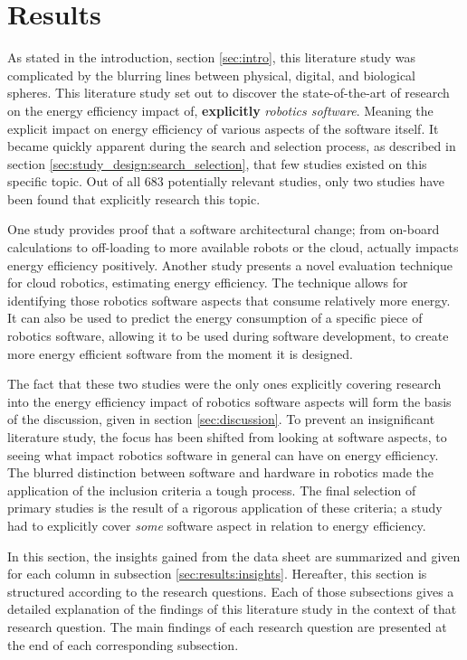 \section{Results}
\label{sec:results}
As stated in the introduction, section \ref{sec:intro}, this literature study was complicated by 
the blurring lines between physical, digital, and biological spheres.
This literature study set out to discover the state-of-the-art of research on the energy efficiency impact of, \textbf{explicitly} \textit{robotics software}.
Meaning the explicit impact on energy efficiency of various aspects of the software itself.
It became quickly apparent during the search and selection process, as described in section \ref{sec:study_design:search_selection}, 
that few studies existed on this specific topic.
Out of all 683 potentially relevant studies, only two studies have been found that explicitly research this topic.

One study \cite{rahman2019cloud_robot_offloading} provides proof that a software architectural change; 
from on-board calculations to off-loading to more available robots or the cloud, actually impacts energy efficiency positively.
Another study \cite{hou2017novel_cloud_evaluation_model} presents a novel evaluation technique for cloud robotics, estimating energy efficiency.
The technique allows for identifying those robotics software aspects that consume relatively more energy. 
It can also be used to predict the energy consumption of a specific piece of robotics software, allowing it to be used during software development, 
to create more energy efficient software from the moment it is designed.

The fact that these two studies were the only ones explicitly covering research into the energy efficiency impact of robotics software aspects will
form the basis of the discussion, given in section \ref{sec:discussion}.
To prevent an insignificant literature study, the focus has been shifted from looking at software aspects, to seeing what impact 
robotics software in general can have on energy efficiency. The blurred distinction between software and hardware in robotics made the 
application of the inclusion criteria a tough process.
The final selection of primary studies is the result of a rigorous application of these criteria; 
a study had to explicitly cover \textit{some} software aspect in relation to energy efficiency.

In this section, the insights gained from the data sheet are summarized and given for each column in subsection \ref{sec:results:insights}.
Hereafter, this section is structured according to the research questions.
Each of those subsections gives a detailed explanation of the findings of this literature study in the context of that research question.
The main findings of each research question are presented at the end of each corresponding subsection.

